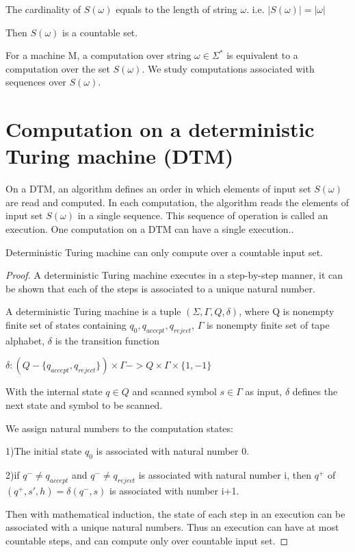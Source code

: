 \documentclass[final,leqno]{siamltex}
\begin{document}
\begin{proposition} 
\label{prop:Card_SW}
The cardinality of $S(\omega)$ equals to the length of string $\omega$. i.e. $|S(\omega)|=|\omega|$
\end{proposition}

Then $S(\omega)$ is a countable set.

For a machine M, a computation over string $\omega\in\Sigma^*$ is equivalent to a computation over the set $S(\omega)$. We study computations associated with sequences over $S(\omega)$.

\section{Computation on a deterministic Turing machine (DTM)}

On a DTM, an algorithm defines an order in which elements of input set $S(\omega)$ are read and computed. In each computation, the algorithm reads the elements of input set $S(\omega)$ in a single sequence. This sequence of operation is called an execution. One computation on a DTM can have a single execution..

\begin{proposition} 
\label{prop:DTM_Countable}
Deterministic Turing machine can only compute over a countable input set.
\end{proposition}

\begin{proof}
A deterministic Turing machine executes in a step-by-step manner, it can be shown that each of the steps is associated to a unique natural number.

A deterministic Turing machine is a tuple $(\Sigma,\Gamma,Q,\delta)$, where Q is nonempty finite set of states containing $q_0,q_{accept},q_{reject}$, $\Gamma$ is nonempty finite set of tape alphabet, $\delta$ is the transition function

$\delta:(Q-\{q_{accept},q_{reject}\})\times\Gamma->Q\times\Gamma\times\{1,-1\}$

With the internal state $q\in Q$ and scanned symbol $s\in\Gamma$ as input, $\delta$ defines the next state and symbol to be scanned.

We assign natural numbers to the computation states:

1)The initial state $q_0$ is associated with natural number 0.

2)if $q^-\neq q_{accept}$ and $q^-\neq q_{reject}$ is associated with natural number i, then $q^+$ of $(q^+,s',h)=\delta(q^-,s)$ is associated with number i+1.

Then with mathematical induction, the state of each step in an execution can be associated with a unique natural numbers. Thus an execution can have at most countable steps, and can compute only over countable input set.

\end{proof}
\end{document}
